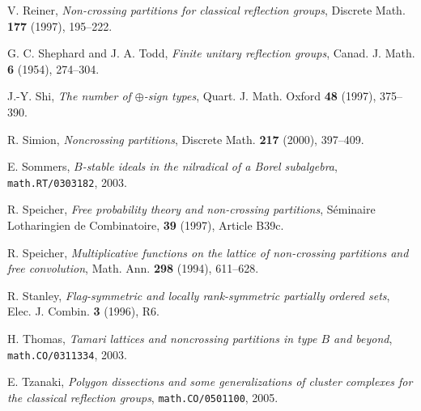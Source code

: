 \documentclass[12pt,letterpaper, reqno]{amsart}
\begin{document}
\begin{thebibliography}{99}
V. Reiner, \emph{Non-crossing partitions for classical reflection groups}, Discrete Math. {\bf 177} (1997), 195--222.

G. C. Shephard and J. A. Todd, \emph{Finite unitary reflection groups}, Canad. J. Math. {\bf 6} (1954), 274--304.

J.-Y. Shi, \emph{The number of $\oplus$-sign types}, Quart. J. Math. Oxford {\bf 48} (1997), 375--390.

R. Simion, \emph{Noncrossing partitions}, Discrete Math. {\bf 217} (2000), 397--409.

E. Sommers, \emph{$B$-stable ideals in the nilradical of a Borel subalgebra}, \texttt{math.RT/0303182}, 2003.

R. Speicher, \emph{Free probability theory and non-crossing partitions}, S\'eminaire Lotharingien de Combinatoire, {\bf 39} (1997), Article B39c.

R. Speicher, \emph{Multiplicative functions on the lattice of non-crossing partitions and free convolution}, Math. Ann. {\bf 298} (1994), 611--628.

R. Stanley, \emph{Flag-symmetric and locally rank-symmetric partially ordered sets}, Elec. J. Combin. {\bf 3} (1996), R6.

H. Thomas, \emph{Tamari lattices and noncrossing partitions in type $B$ and beyond}, \texttt{math.CO/0311334}, 2003.

E. Tzanaki, \emph{Polygon dissections and some generalizations of cluster complexes for the classical reflection groups}, \texttt{math.CO/0501100}, 2005.

\end{thebibliography}
\end{document}
